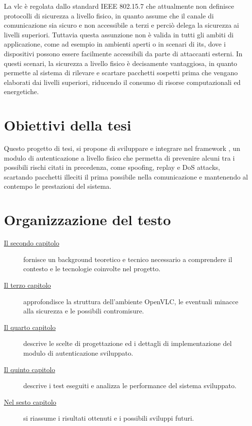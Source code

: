 La \gls{vlc} è regolata dallo standard IEEE 802.15.7 che attualmente non definisce protocolli di sicurezza a livello fisico, in quanto assume che il canale di comunicazione sia sicuro e non accessibile a terzi e perciò delega la sicurezza ai livelli superiori. Tuttavia questa assunzione non è valida in tutti gli ambiti di applicazione, come ad esempio in ambienti aperti o in scenari di \gls{its}, dove i dispositivi possono essere facilmente accessibili da parte di attaccanti esterni.
In questi scenari, la sicurezza a livello fisico è decisamente vantaggiosa, in quanto permette al sistema di rilevare e scartare pacchetti sospetti prima che vengano elaborati dai livelli superiori, riducendo il consumo di risorse computazionali ed energetiche.

\section{Obiettivi della tesi}

Questo progetto di tesi, si propone di sviluppare e integrare nel framework \cite{site:openvlc}, un modulo di autenticazione a livello fisico che permetta di prevenire alcuni tra i possibili rischi citati in precedenza, come spoofing, replay e DoS attacks, scartando pacchetti illeciti il prima possibile nella comunicazione e mantenendo al contempo le prestazioni del sistema.

\section{Organizzazione del testo}

\begin{description}
    \item[{\hyperref[cap:background]{Il secondo capitolo}}] fornisce un background teoretico e tecnico necessario a comprendere il contesto e le tecnologie coinvolte nel progetto. 
    
    \item[{\hyperref[cap:analisi]{Il terzo capitolo}}] approfondisce la struttura dell'ambiente OpenVLC, le eventuali minacce alla sicurezza e le possibili contromisure.
    
    \item[{\hyperref[cap:progettazione]{Il quarto capitolo}}] descrive le scelte di progettazione ed i dettagli di implementazione del modulo di autenticazione sviluppato.
    
    \item[{\hyperref[cap:test]{Il quinto capitolo}}] descrive i test eseguiti e analizza le performance del sistema sviluppato.
        
    \item[{\hyperref[cap:conclusioni]{Nel sesto capitolo}}] si riassume i risultati ottenuti e i possibili sviluppi futuri.
\end{description}

